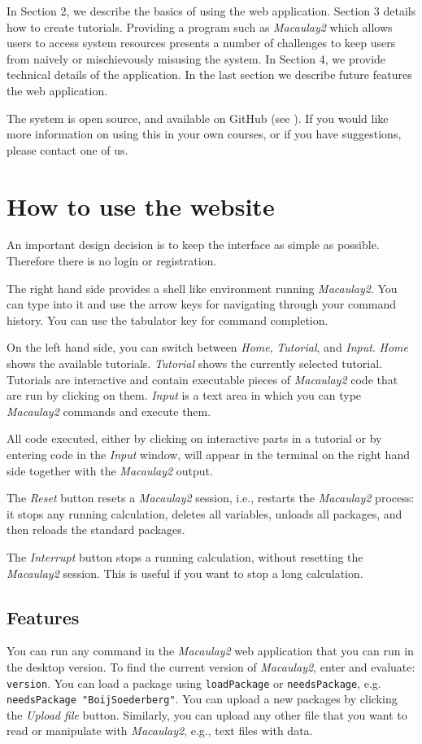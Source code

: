 \documentclass[twocolumn]{article}
\def\M2{{\it Macaulay2}}
\begin{document}
In Section 2, we describe the basics of using the web application.
Section 3 details how to create tutorials.
Providing a program such as \M2 which allows users to
access system resources presents a number of challenges to keep users
from naively or mischievously misusing the system.  In Section 4, we
provide technical details of the application.
In the last section we describe future features the web application.

The system is open source, and available on GitHub (see \cite{github}).
If you would like more information on using this in your own courses,
or if you have suggestions, please contact one of us.


\section{How to use the website}

An important
design decision is to keep the interface as simple as possible.
Therefore there is no login or registration.

The right hand side provides a shell like environment running
\M2. You can type into it and use the arrow keys for
navigating through your command history. You can use the tabulator 
key for command completion. 

On the left hand side, you can switch between {\it Home}, {\it
  Tutorial}, and {\it Input}. {\it Home} shows the available
 tutorials. {\it Tutorial} shows the currently selected
tutorial. Tutorials are interactive and contain executable pieces of
\M2 code that are run by clicking on them. {\it Input} is a
text area in which you can type \M2 commands and execute them.

All code executed, either by clicking on interactive parts in a
tutorial or by entering code in the {\it Input} window, will appear in 
the terminal on the right hand side together with the \M2 output.


The {\it Reset} button resets a \M2 session, i.e., restarts 
the \M2 process: it stops any running calculation, deletes all variables, 
unloads all packages, and then reloads the standard packages.

The {\it Interrupt} button stops a running calculation, without
resetting the \M2 session. This is useful if you want to stop a long calculation.

\subsection{Features}
You can run any command in the \M2 web application that you can run in the desktop version.
To find the current version of \M2,
enter and evaluate: {\tt version}.  You can load a package
 using {\tt loadPackage} or {\tt needsPackage}, e.g. {\tt needsPackage "BoijSoederberg"}.  
You can upload a new packages by clicking the {\it Upload file}
button. Similarly, you can upload any other file that you want to 
read or manipulate with \M2, e.g., text files with data. 
\end{document}
